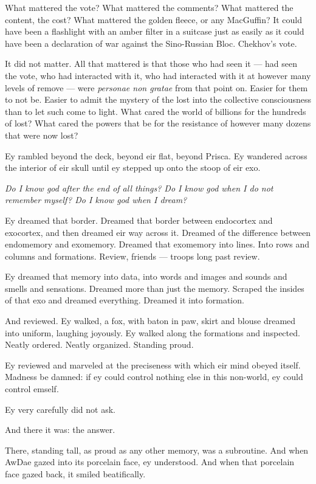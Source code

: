 What mattered the vote? What mattered the comments? What mattered the content, the cost? What mattered the golden fleece, or any MacGuffin? It could have been a flashlight with an amber filter in a suitcase just as easily as it could have been a declaration of war against the Sino-Russian Bloc. Chekhov's vote.

It did not matter. All that mattered is that those who had seen it — had seen the vote, who had interacted with it, who had interacted with it at however many levels of remove — were \emph{personae non gratae} from that point on. Easier for them to not be. Easier to admit the mystery of the lost into the collective consciousness than to let such come to light. What cared the world of billions for the hundreds of lost? What cared the powers that be for the resistance of however many dozens that were now lost?

Ey rambled beyond the deck, beyond eir flat, beyond Prisca. Ey wandered across the interior of eir skull until ey stepped up onto the stoop of eir exo.

\emph{Do I know god after the end of all things? Do I know god when I do not remember myself? Do I know god when I dream?}

Ey dreamed that border. Dreamed that border between endocortex and exocortex, and then dreamed eir way across it. Dreamed of the difference between endomemory and exomemory. Dreamed that exomemory into lines. Into rows and columns and formations. Review, friends — troops long past review.

Ey dreamed that memory into data, into words and images and sounds and smells and sensations. Dreamed more than just the memory. Scraped the insides of that exo and dreamed everything. Dreamed it into formation.

And reviewed. Ey walked, a fox, with baton in paw, skirt and blouse dreamed into uniform, laughing joyously. Ey walked along the formations and inspected. Neatly ordered. Neatly organized. Standing proud.

Ey reviewed and marveled at the preciseness with which eir mind obeyed itself. Madness be damned: if ey could control nothing else in this non-world, ey could control emself.

Ey very carefully did not ask.

And there it was: the answer.

There, standing tall, as proud as any other memory, was a subroutine. And when AwDae gazed into its porcelain face, ey understood. And when that porcelain face gazed back, it smiled beatifically.

